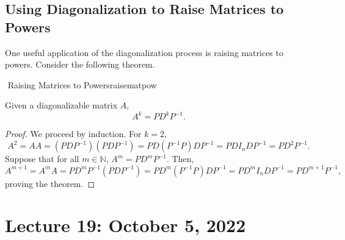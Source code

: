     \subsection{Using Diagonalization to Raise Matrices to Powers}

        One useful application of the diagonalization process is raising matrices to powers. Consider the following theorem.
        \begin{theorem}{\Stop\,\,Raising Matrices to Powers}{raisematpow}

            Given a diagonalizable matrix \(A\),
            \begin{equation*}
                A^k=PD^kP^{-1}.
            \end{equation*}
            \begin{proof}
                We proceed by induction. For \(k=2\),
                \begin{equation*}
                    A^2=AA=(PDP^{-1})(PDP^{-1})=PD(P^{-1}P)DP^{-1}=PDI_nDP^{-1}=PD^2P^{-1}.
                \end{equation*}
                Suppose that for all \(m\in\mathbb{N}\), \(A^m=PD^mP^{-1}\). Then,
                \begin{equation*}
                    A^{m+1}=A^mA=PD^mP^{-1}(PDP^{-1})=PD^m(P^{-1}P)DP^{-1}=PD^mI_nDP^{-1}=PD^{m+1}P^{-1},
                \end{equation*}
                proving the theorem.
            \end{proof}
            
        \end{theorem} 

\pagebreak

\section{Lecture 19: October 5, 2022}

    \begin{comment}
        \subsection{}

        Consider \(\vec{v}=[a_1,\ldots,a_n]\). We then form
        \begin{equation*}
            A=\begin{bmatrix}
                a_1 & a_2 & \cdots & a_n \\
                a_1 & a_2 & \cdots & a_n \\
                \vdots & \vdots & \ddots & \vdots \\
                a_1 & a_2 & \cdots & a_n
            \end{bmatrix}.
        \end{equation*}
        We seek to find the eigenvalues. Because \(A\) is singular, \(0\) is an eigenvalue. We also see that \(a_1+\cdots+a_n\) is an eigenvalue with eigenvector \([1,\cdots,1]\).

    \end{comment}

